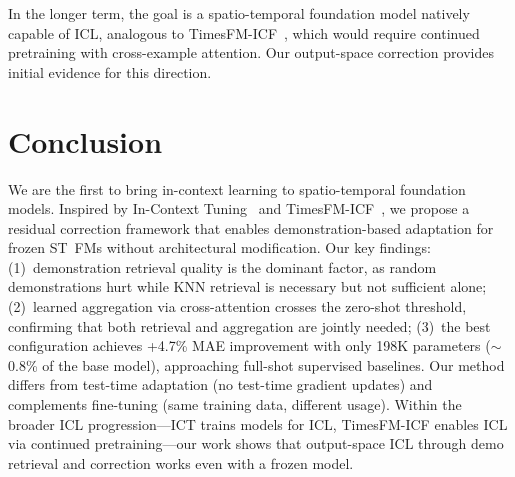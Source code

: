 \documentclass[conference]{IEEEtran}
\begin{document}
In the longer term, the goal is a spatio-temporal foundation model natively capable of ICL, analogous to TimesFM-ICF~\cite{das2024icf}, which would require continued pretraining with cross-example attention.
Our output-space correction provides initial evidence for this direction.

\section{Conclusion}

We are the first to bring in-context learning to spatio-temporal foundation models.
Inspired by In-Context Tuning~\cite{chen2022ict} and TimesFM-ICF~\cite{das2024icf}, we propose a residual correction framework that enables demonstration-based adaptation for frozen ST~FMs without architectural modification.
Our key findings: (1)~demonstration retrieval quality is the dominant factor, as random demonstrations hurt while KNN retrieval is necessary but not sufficient alone; (2)~learned aggregation via cross-attention crosses the zero-shot threshold, confirming that both retrieval and aggregation are jointly needed; (3)~the best configuration achieves +4.7\% MAE improvement with only 198K parameters (${\sim}$0.8\% of the base model), approaching full-shot supervised baselines.
Our method differs from test-time adaptation (no test-time gradient updates) and complements fine-tuning (same training data, different usage).
Within the broader ICL progression---ICT trains models for ICL, TimesFM-ICF enables ICL via continued pretraining---our work shows that output-space ICL through demo retrieval and correction works even with a frozen model.



\end{document}
